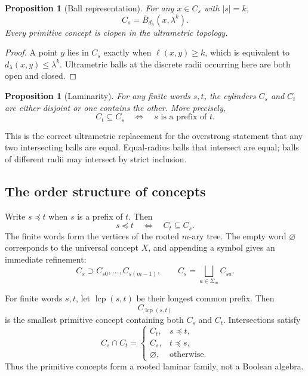 \documentclass[11pt]{article}
\newtheorem{proposition}[theorem]{Proposition}
\theoremstyle{definition}
\theoremstyle{remark}
\newcommand{\cyl}[1]{C_{#1}}
\newcommand{\pref}{\preceq}
\newcommand{\lcp}{\operatorname{lcp}}
\begin{document}
\begin{proposition}[Ball representation]\label{prop:ball}
For any $x\in\cyl{s}$ with $|s|=k$,
\[
\cyl{s}=\overline B_{d_\lambda}(x,\lambda^k).
\]
Every primitive concept is clopen in the ultrametric topology.
\end{proposition}

\begin{proof}
A point $y$ lies in $\cyl{s}$ exactly when $\ell(x,y)\ge k$, which is equivalent to $d_\lambda(x,y)\le\lambda^k$.  Ultrametric balls at the discrete radii occurring here are both open and closed.
\end{proof}

\begin{proposition}[Laminarity]\label{prop:laminar}
For any finite words $s,t$, the cylinders $\cyl{s}$ and $\cyl{t}$ are either disjoint or one contains the other.  More precisely,
\[
\cyl{t}\subseteq\cyl{s}
\quad\Longleftrightarrow\quad
s\text{ is a prefix of }t.
\]
\end{proposition}

This is the correct ultrametric replacement for the overstrong statement that any two intersecting balls are equal.  Equal-radius balls that intersect are equal; balls of different radii may intersect by strict inclusion.

\subsection{The order structure of concepts}

Write $s\pref t$ when $s$ is a prefix of $t$.  Then
\[
s\pref t \quad\Longleftrightarrow\quad \cyl{t}\subseteq\cyl{s}.
\]
The finite words form the vertices of the rooted $m$-ary tree.  The empty word $\varnothing$ corresponds to the universal concept $X$, and appending a symbol gives an immediate refinement:
\[
\cyl{s}\supset \cyl{s0},\ldots,\cyl{s(m-1)},
\qquad
\cyl{s}=\bigsqcup_{a\in\Sigma_m}\cyl{sa}.
\]

For finite words $s,t$, let $\lcp(s,t)$ be their longest common prefix.  Then
\[
\cyl{\lcp(s,t)}
\]
is the smallest primitive concept containing both $\cyl{s}$ and $\cyl{t}$.  Intersections satisfy
\[
\cyl{s}\cap\cyl{t}=
\begin{cases}
\cyl{t},&s\pref t,\\
\cyl{s},&t\pref s,\\
\varnothing,&\text{otherwise.}
\end{cases}
\]
Thus the primitive concepts form a rooted laminar family, not a Boolean algebra.
\end{document}
